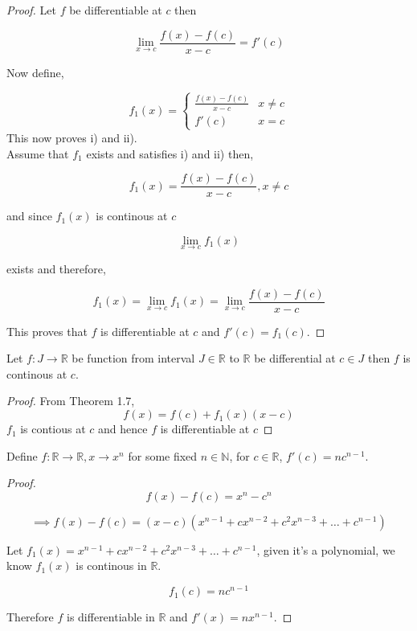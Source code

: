 \documentclass[11pt,a4paper]{colorart}
\def\l{\left}
\def\r{\right}
\def\R{\mathbb{R}}
\def\N{\mathbb{N}}
\def\ra{\rightarrow}
\begin{document}
\begin{proof}
	Let $f$ be differentiable at $c$ then
	
	\[ \lim_{ x \to c } \frac{ f(x) - f(c) }{ x - c} = f'(c) \]
	
	Now define, 

	\[ f_1(x) = \l\{ 
		\begin{array}{ll}
			\frac{ f(x) - f(c) }{ x -c } & x \neq c\\ 
	   		f'(c) & x=c 
		\end{array} 
		     \r. \]
	This now proves i) and ii).\\

	Assume that $f_1$ exists and satisfies i) and ii) then,
	
	\[ f_1(x) = \frac{ f(x) - f(c) }{ x-c }, x \neq c \]
	
	and since $f_1(x)$ is continous at $c$ 
	
	\[ \lim_{x \to c} f_1(x) \]
	
	exists and therefore,
	
	\[ f_1(x) = \lim_{ x \to c } f_1(x) = \lim_{x \to c} \frac{ f(x) - f(c) }{ x-c } \]

	This proves that $f$ is differentiable at $c$ and $f'(c) = f_1(c)$.
\end{proof}

\begin{corollary}
	Let $f:J\ra\R$ be function from interval $J\in\R$ to $\R$ be differential at $c\in J$ then $f$ is continous at $c$.
\end{corollary}

\begin{proof}
	From Theorem 1.7,
	\[ f(x) = f(c) + f_1(x)  (x-c) \]
	$f_1$ is contious at $c$ and hence $f$ is differentiable at $c$
\end{proof}

\begin{example}
	Define $f: \R \ra \R, x \ra x^n$ for some fixed $n \in \N$, for $c \in \R$, $f'(c) = nc^{n-1}$.
\end{example}

\begin{proof}
	
	\[ f(x) - f(c) = x^n - c^n \]
	
	\[ \implies f(x) - f(c) = ( x-c ) ( x^{n-1} + c x^{n-2} + c^2 x^{n-3} + \dots + c^{n-1} ) \]

	Let $f_1(x) = x^{n-1} + c x^{n-2} + c^2 x^{n-3} + \dots + c^{n-1}$, given it's a polynomial, we know $f_1(x)$ is continous in $\R$.

	\[ f_1(c) = nc^{n-1} \]

	Therefore $f$ is differentiable in $\R$ and $f'(x) = nx^{n-1}$.

\end{proof}
\end{document}
